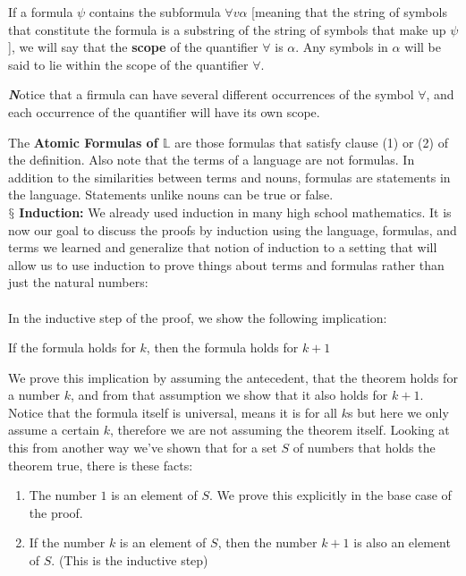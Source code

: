 \documentclass[9pt,a4paper, twocolumn]{article}
\newcounter{theo}
\newenvironment{callout}
	{\begin{calloutbox}\color{charcoal}\textbf\textit}
	{\end{calloutbox}}
\newcommand{\newpoint}[1]{\ \\ \indent$\mathsection$ \textbf{#1}}
\newcommand{\curveL}{\mathbb{L} }
\begin{document}
        If a formula $\psi$ contains the subformula $\forall v \alpha$ [meaning that the string of symbols that constitute the formula is a substring of the string of symbols that make up $\psi$], we will say that the \textbf{scope} of the quantifier $\forall$ is $\alpha$. Any symbols in $\alpha$ will be said to lie within the scope of the quantifier $\forall$.
        \begin{callout}
            Notice that a firmula can have several different occurrences of the symbol $\forall$, and each occurrence of the quantifier will have its own scope.
        \end{callout}
        The \textbf{Atomic Formulas of $\curveL$} are those formulas that satisfy clause (1) or (2) of the definition. Also note that the terms of a language are not formulas. In addition to the similarities between terms and nouns, formulas are statements in the language. Statements unlike nouns can be true or false. 
        \newpoint{Induction:} We already used induction in many high school mathematics. It is now our goal to discuss the proofs by induction using the language, formulas, and terms we learned and generalize that notion of induction to a setting that will allow us to use induction to prove things about terms and formulas rather than just the natural numbers:
        \\
        \\
        In the inductive step of the proof, we show the following implication:
        \begin{center}
            If the formula holds for $k$, then the formula holds for $k+1$
        \end{center}
        We prove this implication by assuming the antecedent, that the theorem holds for a number $k$, and from that assumption we show that it also holds for $k+1$. Notice that the formula itself is universal, means it is for all $k$s but here we only assume a certain $k$, therefore we are not assuming the theorem itself. Looking at this from another way we've shown that for a set $S$ of numbers that holds the theorem true, there is these facts:
        \begin{enumerate}
            \item The number $1$ is an element of $S$. We prove this explicitly in the base case of the proof.
            \item If the number $k$ is an element of $S$, then the number $k+1$ is also an element of $S$. (This is the inductive step)
        \end{enumerate}
\end{document}
